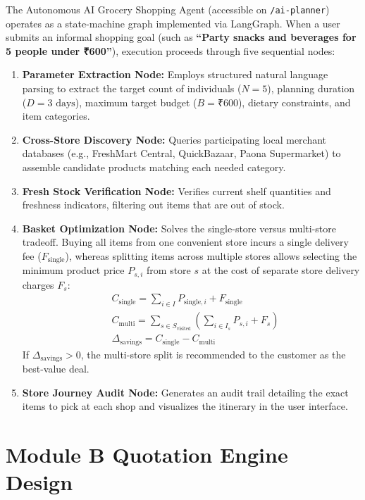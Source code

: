 The Autonomous AI Grocery Shopping Agent (accessible on \texttt{/ai-planner}) operates as a state-machine graph implemented via LangGraph. When a user submits an informal shopping goal (such as \textbf{``Party snacks and beverages for 5 people under ₹600''}), execution proceeds through five sequential nodes:

\begin{enumerate}
    \item \textbf{Parameter Extraction Node:} Employs structured natural language parsing to extract the target count of individuals ($N=5$), planning duration ($D=3\text{ days}$), maximum target budget ($B=₹600$), dietary constraints, and item categories.
    \item \textbf{Cross-Store Discovery Node:} Queries participating local merchant databases (e.g., FreshMart Central, QuickBazaar, Paona Supermarket) to assemble candidate products matching each needed category.
    \item \textbf{Fresh Stock Verification Node:} Verifies current shelf quantities and freshness indicators, filtering out items that are out of stock.
    \item \textbf{Basket Optimization Node:} Solves the single-store versus multi-store tradeoff. Buying all items from one convenient store incurs a single delivery fee ($F_{\text{single}}$), whereas splitting items across multiple stores allows selecting the minimum product price $P_{s, i}$ from store $s$ at the cost of separate store delivery charges $F_s$:
    \begin{align}
        &C_{\text{single}} = \sum_{i \in I} P_{\text{single}, i} + F_{\text{single}} \\
        &C_{\text{multi}} = \sum_{s \in S_{\text{visited}}} \left( \sum_{i \in I_s} P_{s, i} + F_s \right) \\
        &\Delta_{\text{savings}} = C_{\text{single}} - C_{\text{multi}}
    \end{align}
    If $\Delta_{\text{savings}} > 0$, the multi-store split is recommended to the customer as the best-value deal.
    \item \textbf{Store Journey Audit Node:} Generates an audit trail detailing the exact items to pick at each shop and visualizes the itinerary in the user interface.
\end{enumerate}

\section{Module B Quotation Engine Design}

